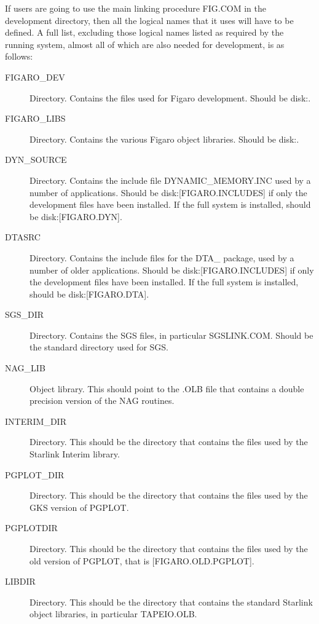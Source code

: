 If users are going to use the main linking procedure FIG.COM in the development
directory, then all the logical names that it uses will have to be defined. A
full list, excluding those logical names listed as required by the running
system, almost all of which are also needed for development, is as follows:

\begin{description}

\item [FIGARO\_DEV] Directory. Contains the files used for Figaro
development. Should be disk:.

\item [FIGARO\_LIBS] Directory. Contains the various Figaro object libraries.
Should be disk:.

\item [DYN\_SOURCE] Directory. Contains the include file DYNAMIC\_MEMORY.INC
used by a number of applications. Should be disk:[FIGARO.INCLUDES] if
only the development files have been installed. If the full system is
installed, should be disk:[FIGARO.DYN].

\item [DTASRC] Directory. Contains the include files for the DTA\_
package, used by a number of older applications. Should be
disk:[FIGARO.INCLUDES] if only the development files have been installed. If
the full system is installed, should be disk:[FIGARO.DTA].

\item [SGS\_DIR] Directory. Contains the SGS files, in particular
SGSLINK.COM. Should be the standard directory used for SGS.

\item [NAG\_LIB] Object library. This should point to the .OLB file that
contains a double precision version of the NAG routines.

\item [INTERIM\_DIR] Directory. This should be the directory that contains the
files used by the Starlink Interim library.

\item [PGPLOT\_DIR] Directory. This should be the directory that contains the
files used by the GKS version of PGPLOT.

\item [PGPLOTDIR] Directory. This should be the directory that contains the
files used by the old version of PGPLOT, that is [FIGARO.OLD.PGPLOT].

\item [LIBDIR] Directory. This should be the directory that contains the
standard Starlink object libraries, in particular TAPEIO.OLB.


\end{description}
